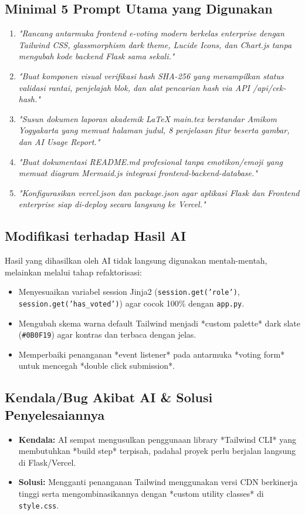 \documentclass[12pt, a4paper]{article}
\begin{document}
\subsection{Minimal 5 Prompt Utama yang Digunakan}
\begin{enumerate}
    \item \textit{"Rancang antarmuka frontend e-voting modern berkelas enterprise dengan Tailwind CSS, glassmorphism dark theme, Lucide Icons, dan Chart.js tanpa mengubah kode backend Flask sama sekali."}
    \item \textit{"Buat komponen visual verifikasi hash SHA-256 yang menampilkan status validasi rantai, penjelajah blok, dan alat pencarian hash via API /api/cek-hash."}
    \item \textit{"Susun dokumen laporan akademik LaTeX main.tex berstandar Amikom Yogyakarta yang memuat halaman judul, 8 penjelasan fitur beserta gambar, dan AI Usage Report."}
    \item \textit{"Buat dokumentasi README.md profesional tanpa emotikon/emoji yang memuat diagram Mermaid.js integrasi frontend-backend-database."}
    \item \textit{"Konfigurasikan vercel.json dan package.json agar aplikasi Flask dan Frontend enterprise siap di-deploy secara langsung ke Vercel."}
\end{enumerate}

\subsection{Modifikasi terhadap Hasil AI}
Hasil yang dihasilkan oleh AI tidak langsung digunakan mentah-mentah, melainkan melalui tahap refaktorisasi:
\begin{itemize}
    \item Menyesuaikan variabel session Jinja2 (\texttt{session.get('role')}, \texttt{session.get('has_voted')}) agar cocok 100\% dengan \texttt{app.py}.
    \item Mengubah skema warna default Tailwind menjadi *custom palette* dark slate (\texttt{\#0B0F19}) agar kontras dan terbaca dengan jelas.
    \item Memperbaiki penanganan *event listener* pada antarmuka *voting form* untuk mencegah *double click submission*.
\end{itemize}

\subsection{Kendala/Bug Akibat AI \& Solusi Penyelesaiannya}
\begin{itemize}
    \item \textbf{Kendala:} AI sempat mengusulkan penggunaan library *Tailwind CLI* yang membutuhkan *build step* terpisah, padahal proyek perlu berjalan langsung di Flask/Vercel.
    \item \textbf{Solusi:} Mengganti penanganan Tailwind menggunakan versi CDN berkinerja tinggi serta mengombinasikannya dengan *custom utility classes* di \texttt{style.css}.
\end{itemize}
\end{document}

